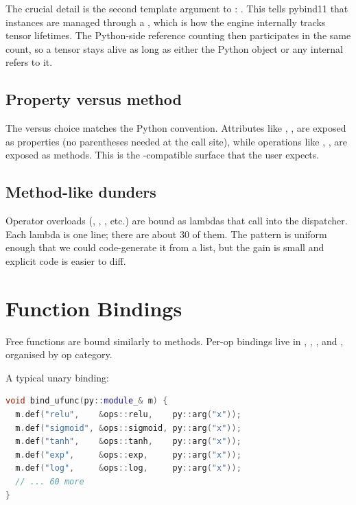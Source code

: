 The crucial detail is the second template argument to
: . This tells
pybind11 that  instances are managed through a
, which is how the engine internally tracks
tensor lifetimes. The Python-side reference counting then
participates in the same  count, so a tensor
stays alive as long as either the Python object or any internal
 refers to it.

\subsection{Property versus method}
\label{ssec:python_cpp_binding:property_method}

The  versus  choice
matches the Python convention. Attributes like ,
,  are exposed as properties (no
parentheses needed at the call site), while operations like
, ,  are exposed as
methods. This is the -compatible surface that the
user expects.

\subsection{Method-like dunders}
\label{ssec:python_cpp_binding:dunders}

Operator overloads (, ,
, etc.) are bound as lambdas that call into
the dispatcher. Each lambda is one line; there are about 30 of
them. The pattern is uniform enough that we could code-generate it
from a list, but the gain is small and explicit code is easier to
diff.

\section{Function Bindings}
\label{sec:python_cpp_binding:function_binding}

Free functions are bound similarly to methods. Per-op bindings live
in , ,
, and , organised
by op category.

A typical unary binding:

\begin{lstlisting}[style=lucidcpp,language=C++]
void bind_ufunc(py::module_& m) {
  m.def("relu",    &ops::relu,    py::arg("x"));
  m.def("sigmoid", &ops::sigmoid, py::arg("x"));
  m.def("tanh",    &ops::tanh,    py::arg("x"));
  m.def("exp",     &ops::exp,     py::arg("x"));
  m.def("log",     &ops::log,     py::arg("x"));
  // ... 60 more
}
\end{lstlisting}

